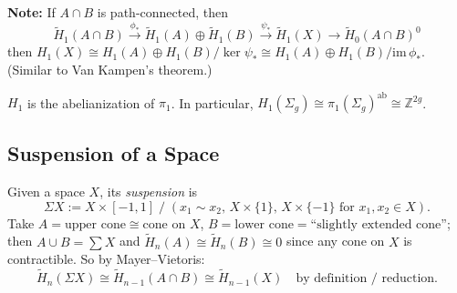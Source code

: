 \documentclass[12pt]{amsart}
\begin{document}
\textbf{Note:} If $A \cap B$ is path-connected, then
\[
    \widetilde{H}_1(A \cap B) \xrightarrow{\phi_*} \widetilde{H}_1(A) \oplus \widetilde{H}_1(B) \xrightarrow{\psi_*} \widetilde{H}_1(X) \to \widetilde{H}_0(A \cap B)^0
\]
then $H_1(X) \cong H_1(A) \oplus H_1(B) / \ker\psi_* \cong H_1(A) \oplus H_1(B) / \mathrm{im}\,\phi_*$. (Similar to Van Kampen's theorem.)

\begin{remark}
$H_1$ is the abelianization of $\pi_1$. In particular, $H_1(\Sigma_g) \cong \pi_1(\Sigma_g)^{\mathrm{ab}} \cong \mathbb{Z}^{2g}$.
\end{remark}

\subsection*{Suspension of a Space}

Given a space $X$, its \emph{suspension} is
\[
    \Sigma X := X \times [-1,1] \;/\; (x_1 \sim x_2, \, X \times \{1\}, \, X \times \{-1\}\text{ for }x_1,x_2 \in X).
\]
Take $A = \text{upper cone} \cong \text{cone on } X$, $B = \text{lower cone} = \text{``slightly extended cone''}$; then $A \cup B = \sum X$ and $\widetilde{H}_n(A) \cong \widetilde{H}_n(B) \cong 0$ since any cone on $X$ is contractible. So by Mayer--Vietoris:
\[
    \widetilde{H}_n(\Sigma X) \cong \widetilde{H}_{n-1}(A \cap B) \cong \widetilde{H}_{n-1}(X) \quad \text{by definition / reduction.}
\]
\end{document}
